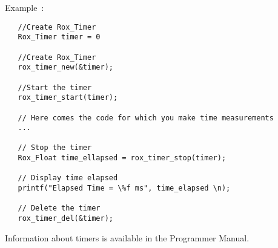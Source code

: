 \noindent Example~:

\begin{lstlisting}
   //Create Rox_Timer 
   Rox_Timer timer = 0

   //Create Rox_Timer 
   rox_timer_new(&timer);

   //Start the timer
   rox_timer_start(timer);

   // Here comes the code for which you make time measurements
   ...

   // Stop the timer
   Rox_Float time_ellapsed = rox_timer_stop(timer);

   // Display time elapsed
   printf("Elapsed Time = \%f ms", time_elapsed \n);

   // Delete the timer
   rox_timer_del(&timer);
\end{lstlisting}

Information about timers is available in the Programmer Manual.
